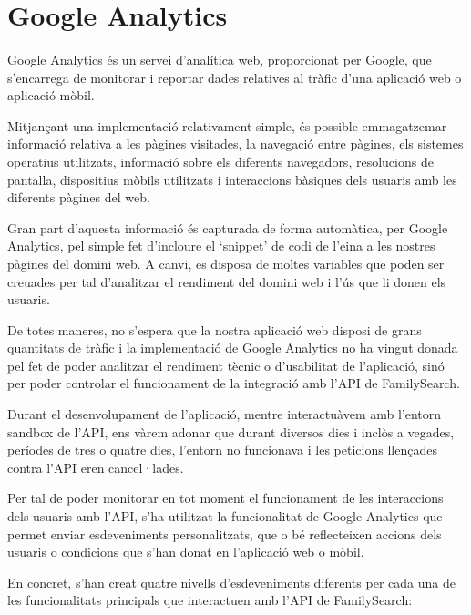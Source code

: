 \section{Google Analytics}

    \paragraph{}
    Google Analytics és un servei d'analítica web, proporcionat per Google, que s'encarrega de monitorar i reportar dades relatives al tràfic d'una aplicació web o aplicació mòbil.

    Mitjançant una implementació relativament simple, és possible emmagatzemar informació relativa a les pàgines visitades, la navegació entre pàgines, els sistemes operatius utilitzats, informació sobre els diferents navegadors, resolucions de pantalla, dispositius mòbils utilitzats i interaccions bàsiques dels usuaris amb les diferents pàgines del web.

    Gran part d'aquesta informació és capturada de forma automàtica, per Google Analytics, pel simple fet d'incloure el `snippet' de codi de l'eina a les nostres pàgines del domini web. A canvi, es disposa de moltes variables que poden ser creuades per tal d'analitzar el rendiment del domini web i l'ús que li donen els usuaris.

    De totes maneres, no s'espera que la nostra aplicació web disposi de grans quantitats de tràfic i la implementació de Google Analytics no ha vingut donada pel fet de poder analitzar el rendiment tècnic o d'usabilitat de l'aplicació, sinó per poder controlar el funcionament de la integració amb l'API de FamilySearch.

    Durant el desenvolupament de l'aplicació, mentre interactuàvem amb l'entorn sandbox de l'API, ens vàrem adonar que durant diversos dies i inclòs a vegades, períodes de tres o quatre dies, l'entorn no funcionava i les peticions llençades contra l'API eren cancel·lades.

    Per tal de poder monitorar en tot moment el funcionament de les interaccions dels usuaris amb l'API, s'ha utilitzat la funcionalitat de Google Analytics que permet enviar esdeveniments personalitzats, que o bé reflecteixen accions dels usuaris o condicions que s'han donat en l'aplicació web o mòbil.

    En concret, s'han creat quatre nivells d'esdeveniments diferents per cada una de les funcionalitats principals que interactuen amb l'API de FamilySearch:

